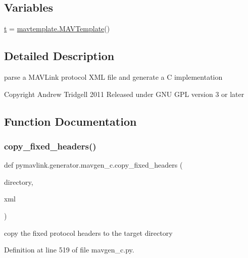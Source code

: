\subsection*{Variables}
\begin{DoxyCompactItemize}
\item 
\mbox{\hyperlink{namespacepymavlink_1_1generator_1_1mavgen__c_a774f91c5f8caa0b1c80610c28d05277b}{t}} = \mbox{\hyperlink{classpymavlink_1_1generator_1_1mavtemplate_1_1MAVTemplate}{mavtemplate.\+M\+A\+V\+Template}}()
\end{DoxyCompactItemize}


\subsection{Detailed Description}
\begin{DoxyVerb}parse a MAVLink protocol XML file and generate a C implementation

Copyright Andrew Tridgell 2011
Released under GNU GPL version 3 or later
\end{DoxyVerb}
 

\subsection{Function Documentation}
\mbox{\label{namespacepymavlink_1_1generator_1_1mavgen__c_a3a09ff51409f0e3465b69f6760f622fb}} 
\subsubsection{\texorpdfstring{copy\_fixed\_headers()}{copy\_fixed\_headers()}}
{\footnotesize\ttfamily def pymavlink.\+generator.\+mavgen\+\_\+c.\+copy\+\_\+fixed\+\_\+headers (\begin{DoxyParamCaption}\item[{}]{directory,  }\item[{}]{xml }\end{DoxyParamCaption})}

\begin{DoxyVerb}copy the fixed protocol headers to the target directory\end{DoxyVerb}
 

Definition at line 519 of file mavgen\+\_\+c.\+py.

